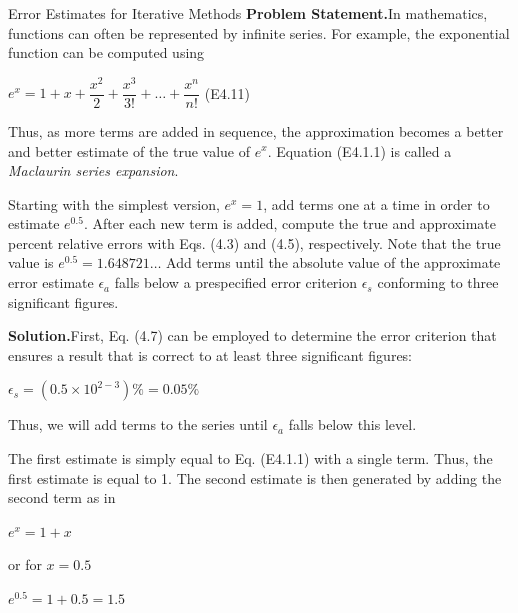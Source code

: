 \documentclass[../main.tex]{subfiles}
\begin{document}
\begin{example} Error Estimates for Iterative Methods
    \bigskip
    \newline
    \textbf{Problem Statement.}\quad In mathematics, functions can often be represented by infinite series.
    For example, the exponential function can be computed using
    \newline
    
    $e^x = 1+x+\dfrac{x^2}{2}+\dfrac{x^3}{3!}+\hdots+\dfrac{x^n}{n!}$
    \hfill (E4.11)
    \newline

    \noindent
    Thus, as more terms are added in sequence, the approximation becomes a better and better
    estimate of the true value of $e^x$. Equation (E4.1.1) is called a \emph{Maclaurin series expansion}.

    Starting with the simplest version, $e^x = 1$, add terms one at a time in order to estimate
    $e^{0.5}$. After each new term is added, compute the true and approximate percent relative errors
    with Eqs. (4.3) and (4.5), respectively. Note that the true value is $e^{0.5} = 1.648721\dots$ Add
    terms until the absolute value of the approximate error estimate $\epsilon_a$ falls below a prespecified
    error criterion $\epsilon_s$ conforming to three significant figures.
    \newline

    \noindent
    \textbf{Solution.}\quad First, Eq. (4.7) can be employed to determine the error criterion that ensures a
    result that is correct to at least three significant figures:
    \newline

    $\epsilon_s = (0.5\times10^{2-3})\%=0.05\%$
    \newline

    \noindent
    Thus, we will add terms to the series until $\epsilon_a$ falls below this level.
    
    The first estimate is simply equal to Eq. (E4.1.1) with a single term. Thus, the first
    estimate is equal to 1. The second estimate is then generated by adding the second term
    as in
    \newline

    $e^x=1+x$
    \newline

    \noindent
    or for $x=0.5$
    \newline

    $e^{0.5}=1+0.5 = 1.5$
    \newline


\end{example}
\end{document}
